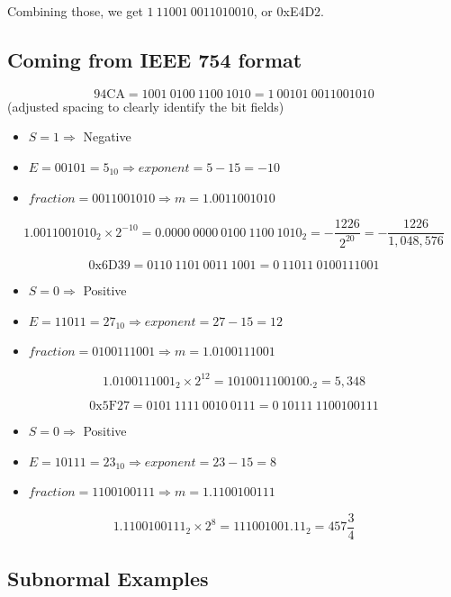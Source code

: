 \documentclass{article}
\begin{document}
Combining those, we get $1\ 11001\ 0011010010$, or 0xE4D2.

\subsection{Coming from IEEE 754 format}

\[\mathrm{94CA} = 1001\ 0100\ 1100\ 1010 = 1\ 00101\ 0011001010\]
(adjusted spacing to clearly identify the bit fields)

\begin{itemize}
\item $S=1 \Rightarrow$ Negative
\item $E = 00101 = 5_{10} \Rightarrow exponent = 5-15 = -10$
\item $fraction = 0011001010 \Rightarrow m = 1.0011001010$
\end{itemize}

\[1.0011001010_2 \times 2^{-10} = 0.0000\ 0000\ 0100\ 1100\ 1010_2 = -\frac{1226}{2^{20}}= -\frac{1226}{1,048,576}\]

\vspace{1.5cm}

\[\mathrm{0x6D39} = 0110\ 1101\ 0011\ 1001 = 0\ 11011\ 0100111001\]

\begin{itemize}
\item $S=0 \Rightarrow$ Positive
\item $E = 11011 = 27_{10} \Rightarrow exponent = 27-15 = 12$
\item $fraction = 0100111001 \Rightarrow m = 1.0100111001$
\end{itemize}

\[1.0100111001_2 \times 2^{12} = 1 0100 1110 0100._2 = 5,348\]

\vspace{1.5cm}

\[\mathrm{0x5F27} = 0101\ 1111\ 0010\ 0111 = 0\ 10111\ 1100100111\]

\begin{itemize}
\item $S=0 \Rightarrow$ Positive
\item $E = 10111 = 23_{10} \Rightarrow exponent = 23-15 = 8$
\item $fraction = 1100100111 \Rightarrow m = 1.1100100111$
\end{itemize}

\[1.1100100111_2 \times 2^{8} = 111001001.11_2 = 457\frac{3}{4}\]

\subsection{Subnormal Examples}
\end{document}
